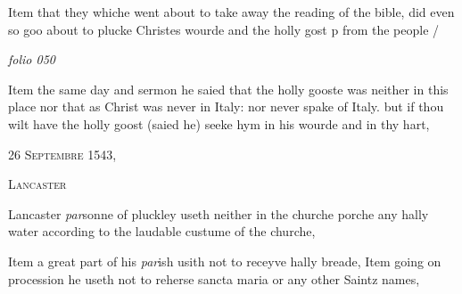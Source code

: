 \documentclass[12pt, a4paper]{book}
\begin{document}
 
		\ifthenelse{\isodd{\thepage}}
		{\reversemarginpar}
		{\normalmarginpar}
		Item that they whiche went about to take away
 the reading of the bible, did even so goo
 about to plucke Christes wourde and the holly
 gost p from the people /
			



\dotfill
						\newpage
{}

\textit{folio 050}



		\ifthenelse{\isodd{\thepage}}
		{\reversemarginpar}
		{\normalmarginpar}
		Item the same day and sermon he saied that the
 holly gooste was neither in this place nor that
 as Christ was never in Italy: nor never
 spake of Italy. but if thou wilt have the
 holly goost (saied he) seeke hym in his wourde
 and in thy hart,
			
 

            
            
               
				\begin{center} \begin{large} {\scshape 
                  26 Septembre 1543,} \end{large} \end{center}
			
               
               	
				\begin{center}  {\scshape Lancaster}  \end{center}
			
               	
				\marginpar[\vspace{0.5cm}{\textcolor{Gray}{holy water}}]{}
			
		\ifthenelse{\isodd{\thepage}}
		{\reversemarginpar}
		{\normalmarginpar}
		Lancaster \textit{par}sonne of pluckley useth neither in the
 churche porche any hally water according to the
 laudable custume of the churche,
               	
               		
				\marginpar[\vspace{0.5cm}{\textcolor{Gray}{holy bread}}]{}
			
               		
		\ifthenelse{\isodd{\thepage}}
		{\reversemarginpar}
		{\normalmarginpar}
		Item a great part of his \textit{par}ish usith not to
 receyve hally breade,
 Item going on procession he useth not to reherse
 sancta maria or any other Saintz names,
               	
\end{document}
